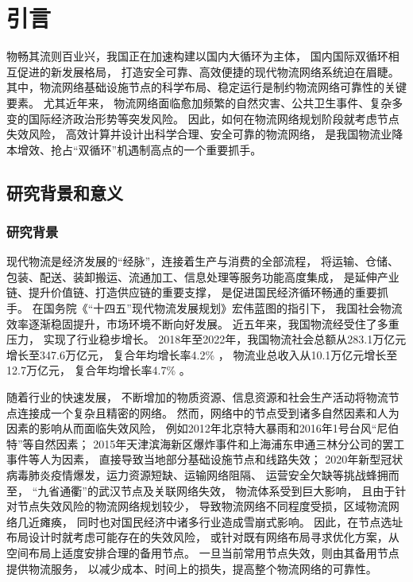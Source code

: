 \setlength{\baselineskip}{20pt}
\chapter{引言}
\label{cha:intro}

\makeatletter
\renewcommand{\cleardoublepage}{\relax
  \clearpage
  \if@twoside \ifodd\c@page\relax\else
  \thispagestyle{empty}%
  \tikz[remember picture, overlay] \node  at (current page.center)
    {\large (本页留空)};\newpage\fi\fi}
\makeatother

物畅其流则百业兴，我国正在加速构建以国内大循环为主体，
国内国际双循环相互促进的新发展格局，
打造安全可靠、高效便捷的现代物流网络系统迫在眉睫。
其中，物流网络基础设施节点的科学布局、稳定运行是制约物流网络可靠性的关键要素。
尤其近年来，
物流网络面临愈加频繁的自然灾害、公共卫生事件、复杂多变的国际经济政治形势等突发风险。
因此，如何在物流网络规划阶段就考虑节点失效风险，
高效计算并设计出科学合理、安全可靠的物流网络，
是我国物流业降本增效、抢占``双循环''机遇制高点的一个重要抓手。

\section{研究背景和意义} 
\label{sec:研究背景和意义}

\subsection{研究背景} 
\label{subsec:研究背景}

现代物流是经济发展的``经脉''，连接着生产与消费的全部流程\cite{唐仁敏}，
将运输、仓储、包装、配送、装卸搬运、流通加工、信息处理等服务功能高度集成，
是延伸产业链、提升价值链、打造供应链的重要支撑，
是促进国民经济循环畅通的重要抓手\cite{王微}。
在国务院《``十四五''现代物流发展规划》宏伟蓝图的指引下，
我国社会物流效率逐渐稳固提升，市场环境不断向好发展。
近五年来，我国物流经受住了多重压力，
实现了行业稳步增长。
2018年至2022年，我国物流社会总额从283.1万亿元增长至347.6万亿元，
复合年均增长率4.2\% ，
物流业总收入从10.1万亿元增长至12.7万亿元，
复合年均增长率4.7\% %
\footnotemark。

随着行业的快速发展，
不断增加的物质资源、信息资源和社会生产活动将物流节点连接成一个复杂且精密的网络。
然而，网络中的节点受到诸多自然因素和人为因素的影响从而面临失效风险，
例如2012年北京特大暴雨和2016年1号台风``尼伯特''等自然因素；
2015年天津滨海新区爆炸事件和上海浦东申通三林分公司的罢工事件等人为因素，
直接导致当地部分基础设施节点和线路失效；
2020年新型冠状病毒肺炎疫情爆发，运力资源短缺、运输网络阻隔、
运营安全欠缺等挑战蜂拥而至，
``九省通衢''的武汉节点及关联网络失效，
物流体系受到巨大影响，
且由于针对节点失效风险的物流网络规划较少，
导致物流网络不同程度受损，区域物流网络几近瘫痪，
同时也对国民经济中诸多行业造成雪崩式影响。
因此，在节点选址布局设计时就考虑可能存在的失效风险，
或针对既有网络布局寻求优化方案，从空间布局上适度安排合理的备用节点。
一旦当前常用节点失效，则由其备用节点提供物流服务，
以减少成本、时间上的损失，提高整个物流网络的可靠性。


